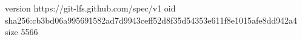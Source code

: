 version https://git-lfs.github.com/spec/v1
oid sha256:cb3bd06a995691582ad7d9943ceff52d8f35d54353e611f8e1015afe8dd942a4
size 5566
